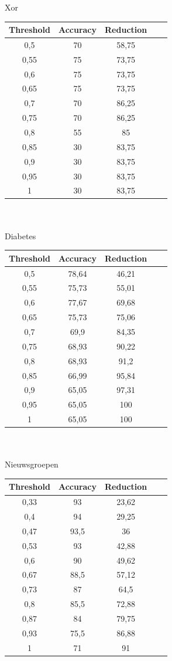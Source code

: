 \documentclass{article}
\begin{document}
Xor\\
\begin{tabular}{|c|c|c|c|c|}  \hline			
Threshold	& Accuracy &	Reduction \\ \hline
0,5 &	70 &	58,75 \\
0,55 &	75 &	73,75 \\
0,6 &	75 &	73,75 \\
0,65 &	75 &	73,75 \\
0,7 &	70 &	86,25 \\
0,75 &	70 &	86,25 \\
0,8 &	55 &	85 \\
0,85 &	30 &	83,75 \\
0,9 &	30 & 83,75 \\
0,95 &	30 &	83,75 \\
1 &	30 &	83,75 \\ \hline
\end{tabular} \\
\\
Diabetes\\
\begin{tabular}{|c|c|c|c|c|}  \hline
Threshold	& Accuracy &	Reduction \\ \hline
0,5 &	78,64 &	46,21 \\
0,55 &	75,73 &	55,01 \\
0,6 &	77,67	 & 69,68 \\
0,65 &	75,73 &	75,06 \\
0,7 &	69,9 &	84,35 \\
0,75 &	68,93 &	90,22 \\
0,8 &	68,93 &	91,2 \\
0,85 &	66,99 &	95,84 \\
0,9 &	65,05 &	97,31 \\
0,95 &	65,05 &	100 \\
1 &	65,05 &	100 \\ \hline
\end{tabular} \\
\\
Nieuwsgroepen\\
\begin{tabular}{|c|c|c|c|c|}  \hline
Threshold	& Accuracy &	Reduction \\ \hline
0,33 &	93 &	23,62 \\
0,4 &	94 &	29,25 \\
0,47 &	93,5 &	36 \\
0,53 &	93 &	42,88 \\
0,6 &	90 &	49,62 \\
0,67 &	88,5 &	57,12 \\
0,73 &	87 &	64,5 \\
0,8 &	85,5 &	72,88 \\
0,87 &	84 &	79,75 \\
0,93 &	75,5 &	86,88 \\
1 &	71 &	91 \\ \hline
\end{tabular} \\
\end{document}
